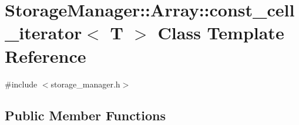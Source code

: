 \hypertarget{classStorageManager_1_1Array_1_1const__cell__iterator}{}\section{Storage\+Manager\+:\+:Array\+:\+:const\+\_\+cell\+\_\+iterator$<$ T $>$ Class Template Reference}
\label{classStorageManager_1_1Array_1_1const__cell__iterator}


{\ttfamily \#include $<$storage\+\_\+manager.\+h$>$}

\subsection*{Public Member Functions}
